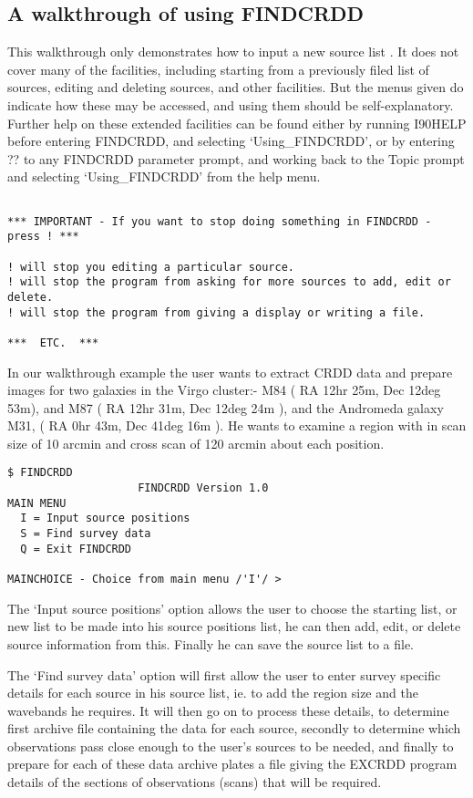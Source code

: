 \subsection{A walkthrough of using FINDCRDD}
This walkthrough only demonstrates how to input a new source list . It does 
not cover many of the facilities, including starting from a previously filed
list of sources, editing and deleting sources, and other facilities. But
the menus given do indicate how these may be accessed, and using them should
be self-explanatory. Further help on these extended facilities can be found
either by running I90HELP before entering FINDCRDD, and selecting
`Using\_FINDCRDD', or by entering ?? to any FINDCRDD parameter prompt, and
working back to the Topic prompt and selecting `Using\_FINDCRDD' from the
help menu.
\begin{verbatim}

*** IMPORTANT - If you want to stop doing something in FINDCRDD - press ! ***

! will stop you editing a particular source.
! will stop the program from asking for more sources to add, edit or delete.
! will stop the program from giving a display or writing a file.

***  ETC.  ***
\end{verbatim}
In our walkthrough example the user wants to extract CRDD data and prepare
images for two galaxies in the Virgo cluster:- M84 ( RA 12hr 25m,
Dec 12deg 53m), and M87 ( RA 12hr 31m, Dec 12deg 24m ), and the Andromeda
galaxy M31, ( RA 0hr 43m, Dec 41deg 16m ). He wants to examine a region with
in scan size of 10 arcmin and cross scan of 120 arcmin about each position.

\begin{verbatim}
$ FINDCRDD
                    FINDCRDD Version 1.0
MAIN MENU
  I = Input source positions
  S = Find survey data
  Q = Exit FINDCRDD

MAINCHOICE - Choice from main menu /'I'/ > 
\end{verbatim}

The `Input source positions' option allows the user to choose the starting
list, or new list to be made into his source positions list, he can then
add, edit, or delete source information from this. Finally he can save the
source list to a file.

The `Find survey data' option will first allow the user to enter survey
specific details for each source in his source list, ie. to add the region
size and the wavebands he requires. It will then go on to process these
details, to determine first archive file containing the data for each source,
secondly to determine which observations pass close enough to the user's
sources to be needed, and finally to prepare for each of these data
archive plates a file giving the EXCRDD program details of the sections of
observations (scans) that will be required.

